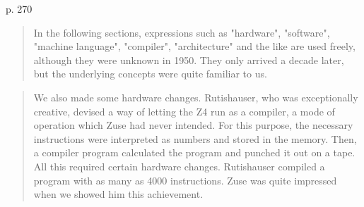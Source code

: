 p. 270
\begin{quotation}
In the following sections, expressions such as "hardware", "software", "machine language", "compiler",
"architecture" and the like are used freely, although they were unknown in 1950. They only arrived a decade
later, but the underlying concepts were quite familiar to us.
\end{quotation}

\begin{quotation}
    We also made some hardware changes. Rutishauser, who was exceptionally creative, devised a way of
letting the Z4 run as a compiler, a mode of operation which Zuse had never intended. For this purpose, the
necessary instructions were interpreted as numbers and stored in the memory. Then, a compiler program
calculated the program and punched it out on a tape. All this required certain hardware changes. Rutishauser
compiled a program with as many as 4000 instructions. Zuse was quite impressed when we showed him this
achievement.
\end{quotation}
